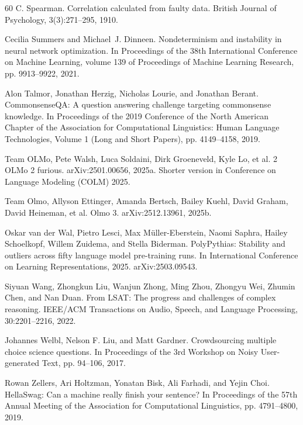 \begin{thebibliography}{60}
C. Spearman. Correlation calculated from faulty data. British Journal of Psychology, 3(3):271--295, 1910.

Cecilia Summers and Michael~J. Dinneen. Nondeterminism and instability in neural network optimization. In Proceedings of the 38th International Conference on Machine Learning, volume 139 of Proceedings of Machine Learning Research, pp. 9913--9922, 2021.

Alon Talmor, Jonathan Herzig, Nicholas Lourie, and Jonathan Berant. CommonsenseQA: A question answering challenge targeting commonsense knowledge. In Proceedings of the 2019 Conference of the North American Chapter of the Association for Computational Linguistics: Human Language Technologies, Volume 1 (Long and Short Papers), pp. 4149--4158, 2019.

Team OLMo, Pete Walsh, Luca Soldaini, Dirk Groeneveld, Kyle Lo, et al. 2 OLMo 2 furious. arXiv:2501.00656, 2025a. Shorter version in Conference on Language Modeling (COLM) 2025.

Team Olmo, Allyson Ettinger, Amanda Bertsch, Bailey Kuehl, David Graham, David Heineman, et al. Olmo 3. arXiv:2512.13961, 2025b.

Oskar van der Wal, Pietro Lesci, Max M\"{u}ller-Eberstein, Naomi Saphra, Hailey Schoelkopf, Willem Zuidema, and Stella Biderman. PolyPythias: Stability and outliers across fifty language model pre-training runs. In International Conference on Learning Representations, 2025. arXiv:2503.09543.

Siyuan Wang, Zhongkun Liu, Wanjun Zhong, Ming Zhou, Zhongyu Wei, Zhumin Chen, and Nan Duan. From LSAT: The progress and challenges of complex reasoning. IEEE/ACM Transactions on Audio, Speech, and Language Processing, 30:2201--2216, 2022.

Johannes Welbl, Nelson F. Liu, and Matt Gardner. Crowdsourcing multiple choice science questions. In Proceedings of the 3rd Workshop on Noisy User-generated Text, pp. 94--106, 2017.

Rowan Zellers, Ari Holtzman, Yonatan Bisk, Ali Farhadi, and Yejin Choi. HellaSwag: Can a machine really finish your sentence? In Proceedings of the 57th Annual Meeting of the Association for Computational Linguistics, pp. 4791--4800, 2019.


\end{thebibliography}
